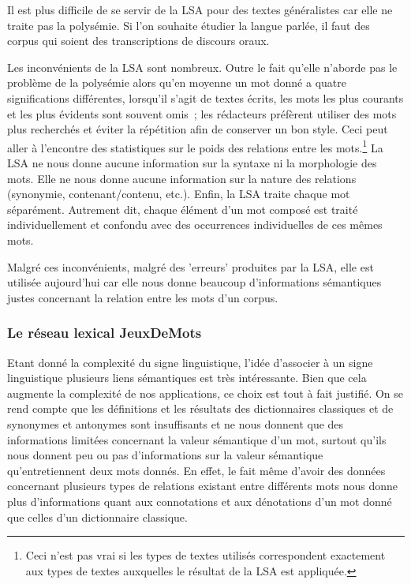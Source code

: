 \documentclass[a4paper,11pt,french]{article}
\begin{document}
Il est plus difficile de se servir de la LSA pour des textes généralistes car elle ne traite pas la polysémie. Si l'on souhaite étudier la langue parlée, il faut des corpus qui soient des transcriptions de discours oraux. 

Les inconvénients de la LSA sont nombreux. Outre le fait qu'elle n'aborde pas le problème de la polysémie alors qu'en moyenne un mot donné a quatre significations différentes, lorsqu'il s'agit de textes écrits, les mots les plus courants et les plus évidents sont souvent omis~; les rédacteurs préfèrent utiliser des mots plus recherchés et éviter la répétition afin de conserver un bon style. Ceci peut aller à l'encontre des statistiques sur le poids des relations entre les mots.\footnote{Ceci n'est pas vrai si les types de textes utilisés correspondent exactement aux types de textes auxquelles le résultat de la LSA est appliquée.} La LSA ne nous donne aucune information sur la syntaxe ni la morphologie des mots. Elle ne nous donne aucune information sur la nature des relations (synonymie, contenant/contenu, etc.). Enfin, la LSA traite chaque mot séparément. Autrement dit, chaque élément d'un mot composé est traité individuellement et confondu avec des occurrences individuelles de ces mêmes mots.

Malgré ces inconvénients, malgré des 'erreurs' produites par la LSA, elle est utilisée aujourd'hui car elle nous donne beaucoup d'informations sémantiques justes concernant la relation entre les mots d'un corpus. 

\subsubsection{Le réseau lexical JeuxDeMots}

Etant donné la complexité du signe linguistique, l'idée d'associer à un signe linguistique plusieurs liens sémantiques est très intéressante. Bien que cela augmente la complexité de nos applications, ce choix est tout à fait justifié. On se rend compte que les définitions et les résultats des dictionnaires classiques et de synonymes et antonymes sont insuffisants et ne nous donnent que des informations limitées concernant la valeur sémantique d'un mot, surtout qu'ils nous donnent peu ou pas d'informations sur la valeur sémantique qu'entretiennent deux mots donnés. En effet, le fait même d'avoir des données concernant plusieurs types de relations existant entre différents mots nous donne plus d'informations quant aux connotations et aux dénotations d'un mot donné que celles d'un dictionnaire classique.
\end{document}
